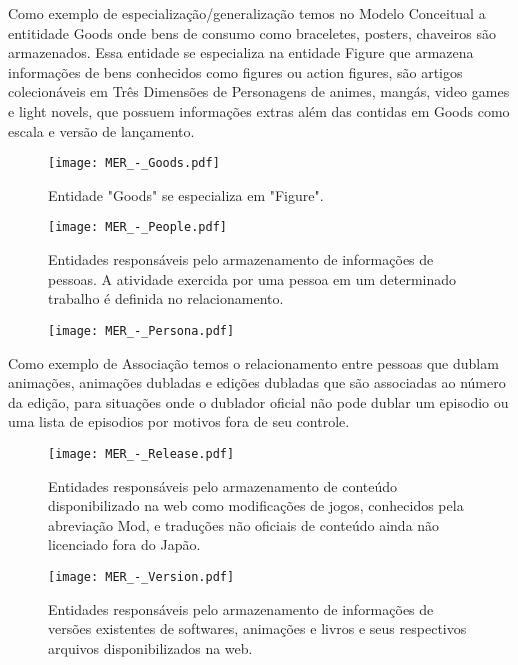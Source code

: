 \documentclass[12pt]{article}
\begin{document}
Como exemplo de especialização/generalização temos no Modelo Conceitual a entitidade Goods onde bens de consumo como braceletes, posters, chaveiros são armazenados. Essa entidade se especializa na entidade Figure que armazena informações de bens conhecidos como figures ou action figures, são artigos colecionáveis em Três Dimensões de Personagens de animes, mangás, video games e light novels,
 que possuem informações extras além das contidas em Goods como escala e versão de lançamento.

\begin{figure}[H]
\centering
\texttt{[image: MER\_-\_Goods.pdf]}
\caption{Entidade "Goods" se especializa em "Figure".} \label{hash}
\end{figure}

\begin{figure}[H]
\centering
\texttt{[image: MER\_-\_People.pdf]}
\caption{Entidades responsáveis pelo armazenamento de informações de pessoas. A atividade exercida por uma pessoa em um determinado trabalho é definida no relacionamento.} \label{hash}
\end{figure}

\begin{figure}[H]
\centering
\texttt{[image: MER\_-\_Persona.pdf]}
\caption{} \label{Persona}
\end{figure}


Como exemplo de Associação temos o relacionamento entre pessoas que dublam animações, animações dubladas e edições dubladas que são associadas ao número da edição, para situações onde o dublador oficial não pode dublar um episodio ou uma lista de episodios por motivos fora de seu controle. 

\begin{figure}[H]
\centering
\texttt{[image: MER\_-\_Release.pdf]}
\caption{Entidades responsáveis pelo armazenamento de conteúdo disponibilizado na web como modificações de jogos, conhecidos pela abreviação Mod, e traduções não oficiais de conteúdo ainda não licenciado fora do Japão.} \label{Release}
\end{figure}

\begin{figure}[H]
\centering
\texttt{[image: MER\_-\_Version.pdf]}
\caption{Entidades responsáveis pelo armazenamento de informações de versões existentes de softwares, animações e livros e seus respectivos arquivos disponibilizados na web.} \label{hash}
\end{figure}
\end{document}

